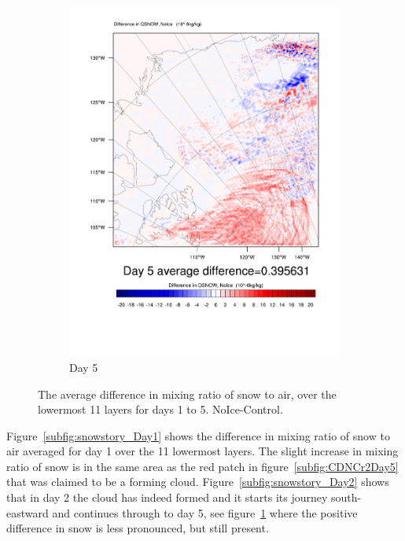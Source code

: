 \begin{figure}
\begin{subfigure}{0.32\textwidth}
		\includegraphics[width=\textwidth]{results/noice/diff_NoIce_qsnow_Day5.pdf}
		\caption{Day 5}
		\label{subfig:snowstory_Day5}
	\end{subfigure}
\caption{The average difference in mixing ratio of snow to air, over the lowermost 11 layers for days 1 to 5. NoIce-Control.}
\label{fig:snowstory}
\end{figure}

Figure~\ref{subfig:snowstory_Day1} shows the difference in mixing ratio of snow to air averaged for day 1 over the 11 lowermost layers. The slight increase in mixing ratio of snow is in the same area as the red patch in figure~\ref{subfig:CDNCr2Day5} that was claimed to be a forming cloud. Figure~\ref{subfig:snowstory_Day2} shows that in day 2 the cloud has indeed formed and it starts its journey south-eastward and continues through to day 5, see figure~\ref{subfig:snowstory_Day5} where the positive difference in snow is less pronounced, but still present.

